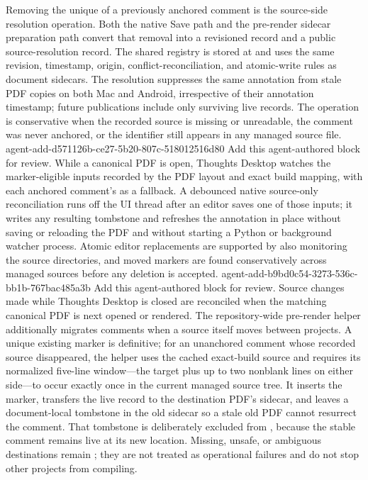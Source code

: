 Removing the unique \code{\ReviewAnchor} of a previously anchored comment is the source-side resolution operation.
Both the native Save path and the pre-render sidecar preparation path convert that removal into a revisioned  record and a public source-resolution record.
The shared registry is stored at  and uses the same revision, timestamp, origin, conflict-reconciliation, and atomic-write rules as document sidecars.
The resolution suppresses the same annotation from stale PDF copies on both Mac and Android, irrespective of their annotation timestamp; future publications include only surviving live records.
The operation is conservative when the recorded source is missing or unreadable, the comment was never anchored, or the identifier still appears in any managed source file.
\agentProposedEdit
  {agent-add-d571126b-ce27-5b20-807c-518012516d80}
  {Add this agent-authored block for review.}
  {}
  {While a canonical PDF is open, Thoughts Desktop watches the marker-eligible  inputs recorded by the PDF layout and exact build mapping, with each anchored comment's  as a fallback.}
A debounced native source-only reconciliation runs off the UI thread after an editor saves one of those inputs; it writes any resulting tombstone and refreshes the annotation in place without saving or reloading the PDF and without starting a Python or background watcher process.
Atomic editor replacements are supported by also monitoring the source directories, and moved markers are found conservatively across managed sources before any deletion is accepted.
\agentProposedEdit
  {agent-add-b9bd0c54-3273-536c-bb1b-767bac485a3b}
  {Add this agent-authored block for review.}
  {}
  {Source changes made while Thoughts Desktop is closed are reconciled when the matching canonical PDF is next opened or rendered.}
The repository-wide pre-render helper additionally migrates comments when a
source itself moves between projects.
A unique existing marker is definitive; for an unanchored comment whose
recorded source disappeared, the helper uses the cached exact-build source and
requires its normalized five-line window---the target plus up to two nonblank
lines on either side---to occur exactly once in the current managed source
tree.
It inserts the marker, transfers the live record to the destination PDF's
sidecar, and leaves a document-local  tombstone in the old
sidecar so a stale old PDF cannot resurrect the comment.
That tombstone is deliberately excluded from
, because the stable comment remains
live at its new location.
Missing, unsafe, or ambiguous destinations remain ;
they are not treated as operational failures and do not stop other projects
from compiling.


